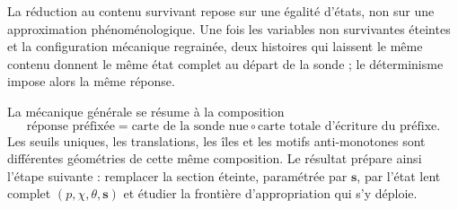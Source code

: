 La réduction au contenu survivant repose sur une égalité d'états, non
sur une approximation phénoménologique. Une fois les variables
non survivantes éteintes et la configuration mécanique regrainée, deux
histoires qui laissent le même contenu donnent le même état complet au
départ de la sonde ; le déterminisme impose alors la même réponse.

La mécanique générale se résume à la composition
\[
\boxed{
\text{réponse préfixée}
=
\text{carte de la sonde nue}
\circ
\text{carte totale d'écriture du préfixe}.
}
\]
Les seuils uniques, les translations, les îles et les motifs
anti-monotones sont différentes géométries de cette même composition.
Le résultat prépare ainsi l'étape suivante : remplacer la section
éteinte, paramétrée par $\mathbf s$, par l'état lent complet
$(p,\chi,\theta,\mathbf s)$ et étudier la frontière d'appropriation qui
s'y déploie.
